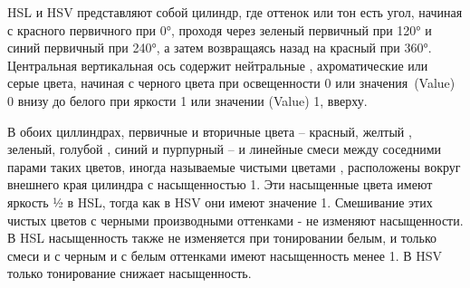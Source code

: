 \begin{figure}[ht!]
\end{figure}

HSL и HSV представляют собой цилиндр, где оттенок или тон есть угол, начиная с красного первичного при 0°, проходя через зеленый первичный при 120° и синий первичный при 240°, а затем возвращаясь назад на красный при 360°. Центральная вертикальная ось содержит нейтральные , ахроматические или серые цвета, начиная с черного цвета при освещенности 0 или значения (Value) 0 внизу до белого при яркости 1 или значении (Value) 1, вверху.

В обоих циллиндрах, первичные и вторичные цвета -- красный, желтый , зеленый, голубой , синий и пурпурный  -- и линейные смеси между соседними парами таких цветов, иногда называемые чистыми цветами , расположены вокруг внешнего края цилиндра с насыщенностью 1. Эти насыщенные цвета имеют яркость ½ в HSL, тогда как в HSV они имеют значение 1. Смешивание этих чистых цветов с черными  производными оттенками - не изменяют насыщенности. В HSL насыщенность также не изменяется при тонировании белым, и только смеси и с черным и с белым оттенками имеют насыщенность менее 1. В HSV только тонирование снижает насыщенность.

